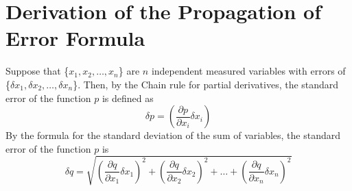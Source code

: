 \documentclass[leqno]{article}
\begin{document}
\section*{Derivation of the Propagation of Error Formula}
Suppose that \{$x_1, x_2, \ldots, x_n$\} are $n$ independent measured variables with errors of \{$\delta x_1, \delta x_2, \ldots, \delta x_n$\}.  Then, by the Chain rule for partial derivatives, the standard error of the function $p$ is defined as
\begin{equation*}
	\delta p = (\frac{\partial p}{\partial x_i}\delta x_i)
\end{equation*}
By the formula for the standard deviation of the sum of variables, the standard error of the function $p$ is
\begin{equation*}
	\delta q=\sqrt{(\frac{\partial q}{\partial x_1}\delta x_1)^2+(\frac{\partial q}{\partial x_2}\delta x_2)^2+\ldots+(\frac{\partial q}{\partial x_n}\delta x_n)^2}
\end{equation*}
\end{document}
